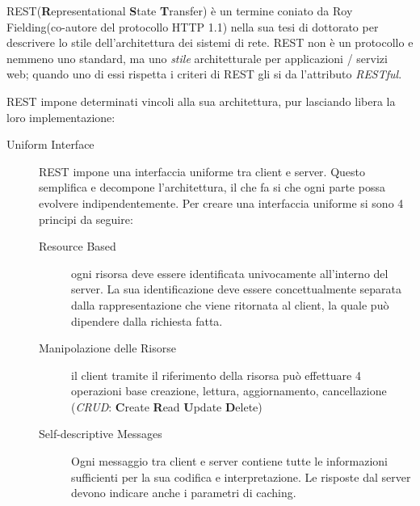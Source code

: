 REST(\textbf{R}epresentational \textbf{S}tate \textbf{T}ransfer) è un termine coniato da Roy Fielding(co-autore del protocollo HTTP 1.1) nella sua tesi di dottorato per descrivere lo stile dell'architettura dei sistemi di rete. REST non è un protocollo e nemmeno uno standard, ma uno \emph{stile} architetturale per applicazioni / servizi web; quando uno di essi rispetta i criteri di REST gli si da l'attributo \emph{RESTful}.

REST impone determinati vincoli alla sua architettura, pur lasciando libera la loro implementazione:

\begin{description}

\item[Uniform Interface] 

REST impone una interfaccia uniforme tra client e server. Questo semplifica e decompone l'architettura, il che fa si che ogni parte possa evolvere indipendentemente. Per creare una interfaccia uniforme si sono 4 principi da seguire:
\begin{description}
\item[Resource Based] 

ogni risorsa deve essere identificata univocamente all'interno del server. La sua identificazione deve essere concettualmente separata dalla rappresentazione che viene ritornata al client, la quale può dipendere dalla richiesta fatta.

\item[Manipolazione delle Risorse] 

il client tramite il riferimento della risorsa può effettuare 4 operazioni base creazione, lettura, aggiornamento, cancellazione (\emph{CRUD}: \textbf{C}reate \textbf{R}ead \textbf{U}pdate \textbf{D}elete)

\item[Self-descriptive Messages] 

Ogni messaggio tra client e server contiene tutte le informazioni sufficienti per la sua codifica e interpretazione. Le risposte dal server devono indicare anche i parametri di caching.


\end{description}
\end{description}
